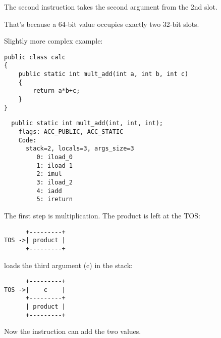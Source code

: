 The second  instruction takes the second argument from the 2nd slot.

That's because a 64-bit  value occupies exactly two 32-bit slots.


Slightly more complex example:


\begin{lstlisting}
public class calc
{
	public static int mult_add(int a, int b, int c)
	{
		return a*b+c;
	}
}
\end{lstlisting}

\begin{lstlisting}
  public static int mult_add(int, int, int);
    flags: ACC_PUBLIC, ACC_STATIC
    Code:
      stack=2, locals=3, args_size=3
         0: iload_0       
         1: iload_1       
         2: imul          
         3: iload_2       
         4: iadd          
         5: ireturn       
\end{lstlisting}

The first step is multiplication. The product is left at the \ac{TOS}:


\begin{lstlisting}
      +---------+
TOS ->| product |
      +---------+
\end{lstlisting}

 loads the third argument (c) in the stack:

\begin{lstlisting}
      +---------+
TOS ->|    c    |
      +---------+
      | product |
      +---------+
\end{lstlisting}

Now the  instruction can add the two values.

